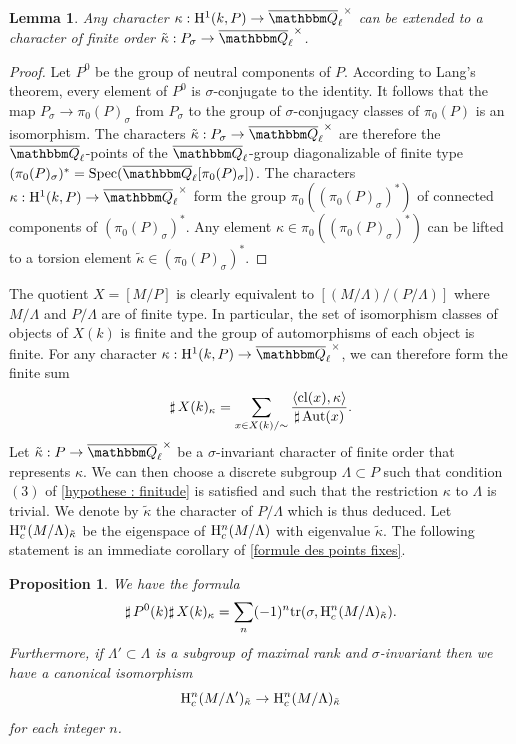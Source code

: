 \documentclass[12pt,english]{smfart}
\numberwithin{equation}{subsection}
\newtheorem{lemme}[equation]{Lemma}
\newtheorem{proposition}[equation]{Proposition}
\theoremstyle{remark}
\newcommand\QQ{{\mathbbm Q}}
\newcommand\rmH{{\rm H}}
\newcommand\tr{{\rm tr}}
\newcommand\Spec{{\rm Spec}}
\newcommand\Aut{{\rm Aut}}
\newcommand\cl{{\rm cl}}
\newcommand\Ql{{\overline\QQ_\ell}}
\begin{document}
\begin{lemme}\label{tilde kappa}
Any character $\kappa:\rmH^1(k,P)\rightarrow \Ql^\times$ can
be extended to a character of finite order $\tilde \kappa:P_\sigma
\rightarrow \Ql^\times$.
\end{lemme}

\begin{proof}
Let $P^0$ be the group of neutral components of $P$. According to Lang's
theorem, every element of $P^0$ is $\sigma$-conjugate to the
identity. It follows that the map $P_\sigma \rightarrow \pi_0(P)_\sigma$
from $P_\sigma$ to the group of $\sigma$-conjugacy classes of
$\pi_0(P)$ is an isomorphism. The characters $\tilde\kappa: P_\sigma
\rightarrow \Ql^\times$ are therefore the $\Ql$-points of the $\Ql$-group
diagonalizable of finite type
$(\pi_0(P)_\sigma)^*=\Spec(\Ql[\pi_0(P)_\sigma])$. The characters
$\kappa:\rmH^1(k,P)\rightarrow \Ql^\times$ form the group
$\pi_0((\pi_0(P)_\sigma)^*)$ of connected components of
$(\pi_0(P)_\sigma)^*$. Any element $\kappa\in
\pi_0((\pi_0(P)_\sigma)^*)$ can be lifted to a torsion element
$\tilde \kappa\in (\pi_0(P)_\sigma)^*$.
\end{proof}

The quotient $X=[M/ P]$ is clearly equivalent to $[(M/ \Lambda)/ (P/
\Lambda)]$ where $M/ \Lambda$ and $P/ \Lambda$ are of finite type. In
particular, the set of isomorphism classes of objects of $X(k)$
is finite and the group of automorphisms of each object is finite. For any
character $\kappa:\rmH^1(k,P)\rightarrow \Ql^\times$, we can therefore
form the finite sum
$${\sharp\,} X(k)_\kappa=\sum_{x\in X(k)/\sim} \frac{\langle \cl(x), \kappa \rangle}
{{\sharp\,} \Aut(x)}.
$$
Let $\tilde\kappa:P \rightarrow \Ql^\times$ be a $\sigma$-invariant
character of finite order that represents $\kappa$. We can then
choose a discrete subgroup $\Lambda\subset P$ such that condition
$(3)$ of \ref{hypothese : finitude} is satisfied and such that the restriction
$\kappa$ to $\Lambda$ is trivial. We denote by $\tilde\kappa$ the
character of $P/ \Lambda$ which is thus deduced. Let $\rmH^n_c(M/
\Lambda)_{\tilde\kappa}$ be the eigenspace of $\rmH^n_c(M/
\Lambda)$ with eigenvalue $\tilde\kappa$. The following statement is an
immediate corollary of \ref{formule des points fixes}.


\begin{proposition}\label{formule des points fixes 2}
We have the formula
$$ {\sharp\,} P^0(k) {\sharp\,} X(k)_{\kappa} =\sum_n (-1)^n \tr(\sigma, \rmH^n_c(M/
\Lambda)_{\tilde\kappa}).
$$
Furthermore, if $\Lambda'\subset \Lambda$ is a subgroup of maximal rank
and $\sigma$-invariant then we have a canonical isomorphism
$$\rmH^n_c(M/\Lambda')_{\tilde\kappa} \rightarrow \rmH^n_c(M/\Lambda)_{\tilde\kappa}$$
for each integer $n$.
\end{proposition}
\end{document}
